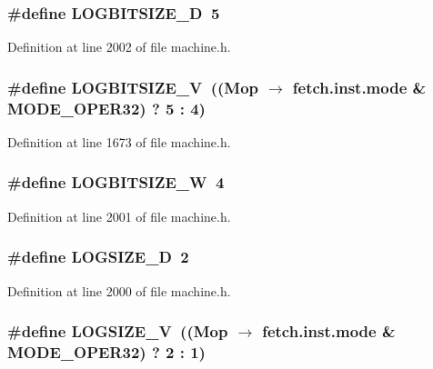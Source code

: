 \subsubsection[{LOGBITSIZE\_\-D}]{\setlength{\rightskip}{0pt plus 5cm}\#define LOGBITSIZE\_\-D~5}\label{machine_8h_2dc9a2298a2b88f6f0625151f9985207}




Definition at line 2002 of file machine.h.
\subsubsection[{LOGBITSIZE\_\-V}]{\setlength{\rightskip}{0pt plus 5cm}\#define LOGBITSIZE\_\-V~((Mop $\rightarrow$ fetch.inst.mode \& MODE\_\-OPER32) ? 5 : 4)}\label{machine_8h_b25257f4a3fd8b0a326c74c73e25fb7a}




Definition at line 1673 of file machine.h.
\subsubsection[{LOGBITSIZE\_\-W}]{\setlength{\rightskip}{0pt plus 5cm}\#define LOGBITSIZE\_\-W~4}\label{machine_8h_c51d301cb65f6182ee3e944cd7f801b4}




Definition at line 2001 of file machine.h.
\subsubsection[{LOGSIZE\_\-D}]{\setlength{\rightskip}{0pt plus 5cm}\#define LOGSIZE\_\-D~2}\label{machine_8h_95ebf5558d0e2f00f863b871242917d1}




Definition at line 2000 of file machine.h.
\subsubsection[{LOGSIZE\_\-V}]{\setlength{\rightskip}{0pt plus 5cm}\#define LOGSIZE\_\-V~((Mop $\rightarrow$ fetch.inst.mode \& MODE\_\-OPER32) ? 2 : 1)}\label{machine_8h_1bc2543cd0e11abe29c9eba6b2bb2076}




